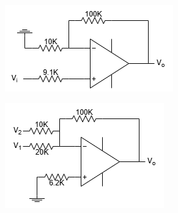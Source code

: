 \begin{figure}[h]
    \vspace{0.2 cm}
        \begin{subfigure}[h]{0.47\textwidth}
        \begin{center}
            \includegraphics[width=1\linewidth]{Lab10/Lab10c.drawio.png} 
            \caption{}
            \label{L10c}
        \end{center}
        \end{subfigure}
    \hfill
        \begin{subfigure}[h]{0.47\textwidth}
        \begin{center}
            \includegraphics[width=1\linewidth]{Lab10/Lab10d.drawio.png}
            \caption{}
            \label{L10d}
        \end{center}
        \end{subfigure}


\end{figure}
